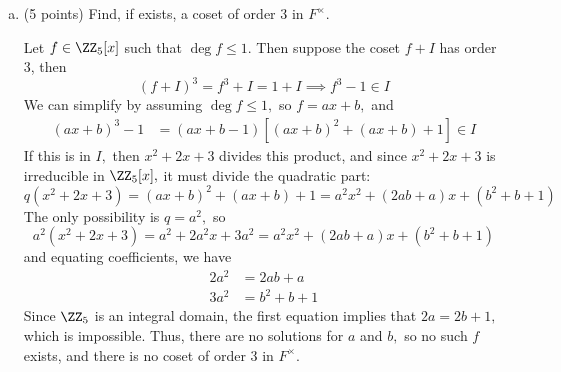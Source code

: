 \documentclass{article}
\begin{document}
\begin{itemize}
\begin{enumerate}[(a)]
\begin{proof}
					If $n=1,$ then 
					\[x-1\in I\implies x-1=h(x^2+2x+3)\]
					for some $h\in \ZZ_5[x].$ This is impossible, because $\ZZ_5$ is an integral domain, so the degree of the RHS is greater than 1. Thus, $n\neq 1.$

					If $n=2,$ then
					\[x^2-1\in I\implies x^2-1=h(x^2+2x+3)\]
					Here, we must have $\deg h=0$ and $h$ monic, so $h=1,$ but this does not satisfy the equality. Thus, $n\neq 2.$

					If $n=3,$ then
					\[x^3-1\in I\implies x^3-1=h(x^2+2x+3)\]
					Here, we must have $\deg h=1$ and $h$ monic, so $h=x+a$ and $a\in\ZZ_5,$ and 
					\[x^3-1=(x+a)(x^2+2x+3)=x^3+(2+a)x^2 + (3+2a)x+3a\]
					We must have $2+a=0\implies a=3,$ but then $3+2a=3+2(3)=9\neq 0,$ so there is no solution for $a.$ Thus, $n\neq 3.$

					Thus, $n=4$ is the smallest integer that satisfies $x^n-1\in I,$ and we know this is true because $x^4-1\equiv1-1=0$ in $\ZZ_5.$ Thus, the order of $\overline x$ is 
				\end{proof}

			\item (5 points) Find, if exists, a coset of order 3 in $F^\times.$
				\begin{soln}
					Let $f\in \ZZ_5[x]$ such that $\deg f\le 1.$ Then suppose the coset $f+I$ has order 3, then 
					\[(f+I)^3=f^3+I=1+I\implies f^3-1\in I\]
					We can simplify by assuming $\deg f\le 1,$ so $f=ax+b,$ and 
					\begin{align*}
						(ax+b)^3-1 &= (ax+b-1)\left[ (ax+b)^2+(ax+b)+1 \right] \in I
					\end{align*}
					If this is in $I,$ then $x^2+2x+3$ divides this product, and since $x^2+2x+3$ is irreducible in $\ZZ_5[x],$ it must divide the quadratic part:
					\[q(x^2+2x+3) = (ax+b)^2+(ax+b)+1 = a^2x^2 + (2ab+a)x + (b^2+b+1)\]
					The only possibility is $q=a^2,$ so 
					\[a^2(x^2+2x+3)=a^2+2a^2x+3a^2 = a^2x^2 + (2ab+a)x + (b^2+b+1)\]
					and equating coefficients, we have
					\begin{align*}
						2a^2 &= 2ab+a \\
						3a^2 &= b^2+b+1
					\end{align*}
					Since $\ZZ_5$ is an integral domain, the first equation implies that $2a=2b+1,$ which is impossible. Thus, there are no solutions for $a$ and $b,$ so no such $f$ exists, and there is no coset of order 3 in $F^\times.$
				\end{soln}
				
		\end{enumerate}


\end{itemize}
\end{document}
